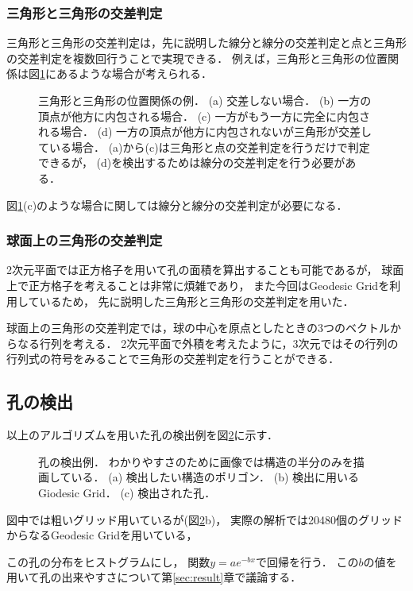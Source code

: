 \subsubsection{三角形と三角形の交差判定}
三角形と三角形の交差判定は，先に説明した線分と線分の交差判定と点と三角形の交差判定を複数回行うことで実現できる．
例えば，三角形と三角形の位置関係は図\ref{fig:triangle_triangle}にあるような場合が考えられる．
\begin{figure}
    \centering
    
    \caption{
        三角形と三角形の位置関係の例．
        (a) 交差しない場合．
        (b) 一方の頂点が他方に内包される場合．
        (c) 一方がもう一方に完全に内包される場合．
        (d) 一方の頂点が他方に内包されないが三角形が交差している場合．
            (a)から(c)は三角形と点の交差判定を行うだけで判定できるが，
            (d)を検出するためは線分の交差判定を行う必要がある．
    }
    \label{fig:triangle_triangle}
\end{figure}
図\ref{fig:triangle_triangle}(c)のような場合に関しては線分と線分の交差判定が必要になる．


\subsubsection{球面上の三角形の交差判定}
2次元平面では正方格子を用いて孔の面積を算出することも可能であるが，
球面上で正方格子を考えることは非常に煩雑であり，
また今回はGeodesic Gridを利用しているため，
先に説明した三角形と三角形の交差判定を用いた．

球面上の三角形の交差判定では，球の中心を原点としたときの3つのベクトルからなる行列を考える．
2次元平面で外積を考えたように，3次元ではその行列の行列式の符号をみることで三角形の交差判定を行うことができる．


\subsection{孔の検出}
以上のアルゴリズムを用いた孔の検出例を図\ref{fig:hole_detection}に示す．
\begin{figure}
    \centering
    
    \caption{
        孔の検出例．
        わかりやすさのために画像では構造の半分のみを描画している．
        (a) 検出したい構造のポリゴン．
        (b) 検出に用いるGiodesic Grid．
        (c) 検出された孔．
    }
    \label{fig:hole_detection}
\end{figure}
図中では粗いグリッド用いているが(図\ref{fig:hole_detection}b)，
実際の解析では20480個のグリッドからなるGeodesic Gridを用いている，

この孔の分布をヒストグラムにし，
関数$y=ae^{-bx}$で回帰を行う．
この$b$の値を用いて孔の出来やすさについて第\ref{sec:result}章で議論する．
